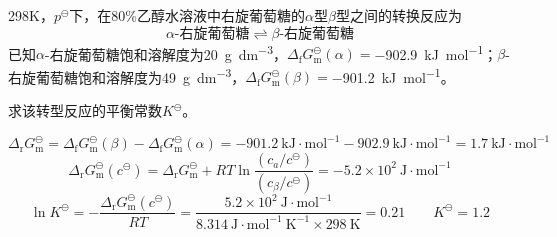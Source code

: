 \begin{frame}
    \frametitle{}

    \begin{example}
        298K，$p^\ominus$下，在80\%乙醇水溶液中右旋葡萄糖的$\alpha$型$\beta$型之间的转换反应为
        \[
            \alpha \text{-右旋葡萄糖}\rightleftharpoons \beta \text{-右旋葡萄糖}
        \]
        已知$\alpha$-右旋葡萄糖饱和溶解度为\SI{20}{g.dm^{-3}}，$\Delta _\mathrm{f}G_\mathrm{m}^\ominus(\alpha)=$\SI{-902.9}{kJ.mol^{-1}}；$\beta$-右旋葡萄糖饱和溶解度为\SI{49}{g.dm^{-3}}，$\Delta _\mathrm{f}G_\mathrm{m}^\ominus(\beta)=$\SI{-901.2}{kJ.mol^{-1}}。

        求该转型反应的平衡常数$K^\ominus$。
    \end{example}
    \vspace{-13pt}
    \pause
    \[
        \Delta_{\mathrm{r}} G_{\mathrm{m}}^{\ominus} =\Delta_{\mathrm{f}} G_{\mathrm{m}}^{\ominus}(\beta)-\Delta_{\mathrm{f}} G_{\mathrm{m}}^{\ominus}(\alpha) =-901.2 \mathrm{~kJ} \cdot \mathrm{mol}^{-1}-902.9 \mathrm{~kJ} \cdot \mathrm{mol}^{-1}=1.7 \mathrm{~kJ} \cdot \mathrm{mol}^{-1}
    \]
    \[
        \Delta_{\mathrm{r}} G_{\mathrm{m}}^{\ominus}(c^{\ominus})= \Delta_{\mathrm{r}} G_{\mathrm{m}}^{\ominus}+R T \ln \frac{(c_{a} / c^{\ominus})}{(c_{\beta} / c^{\ominus})} = -5.2 \times 10^{2} \mathrm{~J} \cdot \mathrm{mol}^{-1}
    \]
    \[
        \ln K^{\ominus}=-\frac{\Delta_{\mathrm{r}} G_{\mathrm{m}}^{\ominus}(c^{\ominus})}{R T}=\frac{5.2 \times 10^{2} \mathrm{~J} \cdot \mathrm{mol}^{-1}}{8.314 \mathrm{~J} \cdot \mathrm{mol}^{-1} \mathrm{~K}^{-1} \times 298 \mathrm{~K}}=0.21 \qquad K^{\ominus}=1.2
    \]

\end{frame}